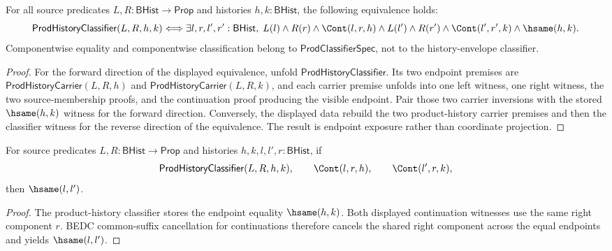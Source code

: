 \begin{theorem}
\label{thm:prod-history-classifier-component-inversion}
For all source predicates $L,R:\mathsf{BHist}\to\mathsf{Prop}$ and histories
$h,k:\mathsf{BHist}$, the following equivalence holds:
$$
\mathsf{ProdHistoryClassifier}(L,R,h,k)
\Longleftrightarrow
\exists l,r,l',r':\mathsf{BHist},\;
L(l)\land R(r)\land \Cont(l,r,h)\land
L(l')\land R(r')\land \Cont(l',r',k)\land \hsame(h,k).
$$
Componentwise equality and componentwise classification belong to
$\mathsf{ProdClassifierSpec}$, not to the history-envelope classifier.
\end{theorem}
\begin{proof}
For the forward direction of the displayed equivalence, unfold
$\mathsf{ProdHistoryClassifier}$. Its two endpoint premises are
$\mathsf{ProdHistoryCarrier}(L,R,h)$ and
$\mathsf{ProdHistoryCarrier}(L,R,k)$, and each carrier premise unfolds into
one left witness, one right witness, the two source-membership proofs, and the
continuation proof producing the visible endpoint. Pair those two carrier
inversions with the stored $\hsame(h,k)$ witness for the forward direction.
Conversely, the displayed data rebuild the two product-history carrier
premises and then the classifier witness for the reverse direction of the
equivalence. The result is endpoint exposure rather than coordinate
projection.
\end{proof}

\begin{theorem}
\label{thm:prod-history-classifier-common-right-component-left-hsame}
For source predicates $L,R:\mathsf{BHist}\to\mathsf{Prop}$ and histories
$h,k,l,l',r:\mathsf{BHist}$, if
$$
\mathsf{ProdHistoryClassifier}(L,R,h,k),
\qquad
\Cont(l,r,h),
\qquad
\Cont(l',r,k),
$$
then $\hsame(l,l')$.
\end{theorem}
\begin{proof}
The product-history classifier stores the endpoint equality $\hsame(h,k)$.
Both displayed continuation witnesses use the same right component $r$.
BEDC common-suffix cancellation for continuations therefore cancels the shared
right component across the equal endpoints and yields $\hsame(l,l')$.
\end{proof}

